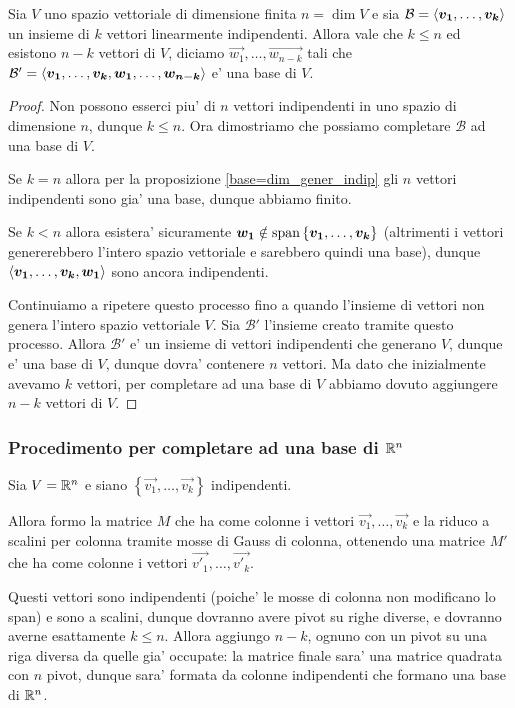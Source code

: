 \begin{theorem}
     \label{th_completamento}
    Sia $V$ uno spazio vettoriale di dimensione finita $n = \dim V$ e sia $\mathcal{B} = \left\langle \bm{v_1}, \dots, \bm{v_k} \right\rangle$ un insieme di $k$ vettori linearmente indipendenti. Allora vale che $k \leq n$ ed esistono $n - k$ vettori di $V$, diciamo ${\vec{w_1}, \dots, \vec{w_{n-k}}}$ tali che $\mathcal{B}' = \left\langle \bm{v_1}, \dots, \bm{v_k}, \bm{w_1}, \dots, \bm{w_{n-k}} \right\rangle$ e' una base di $V$.
\end{theorem}
\begin{proof}
    Non possono esserci piu' di $n$ vettori indipendenti in uno spazio di dimensione $n$, dunque $k \leq n$. Ora dimostriamo che possiamo completare $\mathcal{B}$ ad una base di $V$.

    Se $k = n$ allora per la proposizione \ref{base=dim_gener_indip} gli $n$ vettori indipendenti sono gia' una base, dunque abbiamo finito.

    Se $k < n$ allora esistera' sicuramente $\bm{w_1} \notin \operatorname{span}\left\{\bm{v_1}, \dots, \bm{v_k}\right\}$ (altrimenti i vettori genererebbero l'intero spazio vettoriale e sarebbero quindi una base), dunque $\left\langle \bm{v_1}, \dots, \bm{v_k}, \bm{w_1} \right\rangle$ sono ancora indipendenti.
    
    Continuiamo a ripetere questo processo fino a quando l'insieme di vettori non genera l'intero spazio vettoriale $V$. Sia $\mathcal{B}'$ l'insieme creato tramite questo processo. Allora $\mathcal{B}'$ e' un insieme di vettori indipendenti che generano $V$, dunque e' una base di $V$, dunque dovra' contenere $n$ vettori. Ma dato che inizialmente avevamo $k$ vettori, per completare ad una base di $V$ abbiamo dovuto aggiungere $n-k$ vettori di $V$.
\end{proof}

\subsubsection{Procedimento per completare ad una base di $\mathbb{R}^n$}

Sia $V = \mathbb{R}^n$ e siano $\left\{ \vec{v_1}, \dots, \vec{v_k} \right\}$ indipendenti.

Allora formo la matrice $M$ che ha come colonne i vettori $\vec{v_1}, \dots, \vec{v_k}$ e la riduco a scalini per colonna tramite mosse di Gauss di colonna, ottenendo una matrice $M'$ che ha come colonne i vettori $\vec{v'_1}, \dots, \vec{v'_k}$.

Questi vettori sono indipendenti (poiche' le mosse di colonna non modificano lo span) e sono a scalini, dunque dovranno avere pivot su righe diverse, e dovranno averne esattamente $k \leq n$. Allora aggiungo $n - k$, ognuno con un pivot su una riga diversa da quelle gia' occupate: la matrice finale sara' una matrice quadrata con $n$ pivot, dunque sara' formata da colonne indipendenti che formano una base di $\mathbb{R}^n$.


